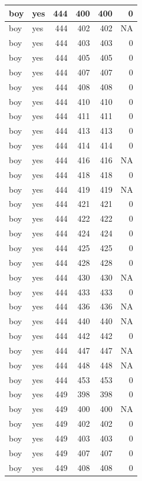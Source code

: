 \documentclass[man]{apa6}
\begin{document}
\begin{tabular}{l|l|r|r|r|r}
\hline
boy & yes & 444 & 400 & 400 & 0\\
\hline
boy & yes & 444 & 402 & 402 & NA\\
\hline
boy & yes & 444 & 403 & 403 & 0\\
\hline
boy & yes & 444 & 405 & 405 & 0\\
\hline
boy & yes & 444 & 407 & 407 & 0\\
\hline
boy & yes & 444 & 408 & 408 & 0\\
\hline
boy & yes & 444 & 410 & 410 & 0\\
\hline
boy & yes & 444 & 411 & 411 & 0\\
\hline
boy & yes & 444 & 413 & 413 & 0\\
\hline
boy & yes & 444 & 414 & 414 & 0\\
\hline
boy & yes & 444 & 416 & 416 & NA\\
\hline
boy & yes & 444 & 418 & 418 & 0\\
\hline
boy & yes & 444 & 419 & 419 & NA\\
\hline
boy & yes & 444 & 421 & 421 & 0\\
\hline
boy & yes & 444 & 422 & 422 & 0\\
\hline
boy & yes & 444 & 424 & 424 & 0\\
\hline
boy & yes & 444 & 425 & 425 & 0\\
\hline
boy & yes & 444 & 428 & 428 & 0\\
\hline
boy & yes & 444 & 430 & 430 & NA\\
\hline
boy & yes & 444 & 433 & 433 & 0\\
\hline
boy & yes & 444 & 436 & 436 & NA\\
\hline
boy & yes & 444 & 440 & 440 & NA\\
\hline
boy & yes & 444 & 442 & 442 & 0\\
\hline
boy & yes & 444 & 447 & 447 & NA\\
\hline
boy & yes & 444 & 448 & 448 & NA\\
\hline
boy & yes & 444 & 453 & 453 & 0\\
\hline
boy & yes & 449 & 398 & 398 & 0\\
\hline
boy & yes & 449 & 400 & 400 & NA\\
\hline
boy & yes & 449 & 402 & 402 & 0\\
\hline
boy & yes & 449 & 403 & 403 & 0\\
\hline
boy & yes & 449 & 407 & 407 & 0\\
\hline
boy & yes & 449 & 408 & 408 & 0\\

\end{tabular}
\end{document}
